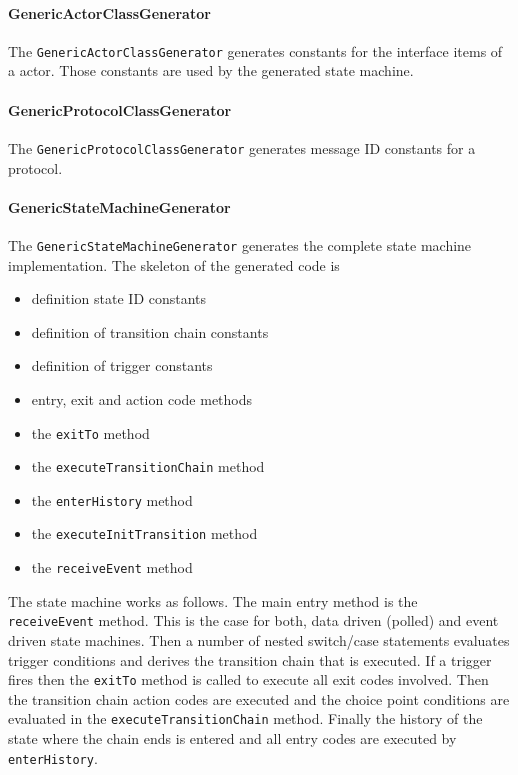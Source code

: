 \paragraph{GenericActorClassGenerator}

The \texttt{GenericActorClassGenerator} generates constants for the interface items of a actor. Those 
constants are used by the generated state machine.

\paragraph{GenericProtocolClassGenerator}

The \texttt{GenericProtocolClassGenerator} generates message ID constants for a protocol.

\paragraph{GenericStateMachineGenerator}

\begin{flushleft}The \texttt{GenericStateMachineGenerator} generates the complete state machine 
implementation. The skeleton of the generated code is\end{flushleft}

\begin{itemize}
\item definition state ID constants
\item definition of transition chain constants
\item definition of trigger constants
\item entry, exit and action code methods
\item the \texttt{exitTo} method 
\item the \texttt{executeTransitionChain} method
\item the \texttt{enterHistory} method
\item the \texttt{executeInitTransition} method
\item the \texttt{receiveEvent} method
\end{itemize}

The state machine works as follows. The main entry method is the \\ \texttt{receiveEvent} method. This is 
the case for both, data driven (polled) and event driven state machines. Then a number of nested 
switch/case statements evaluates trigger conditions and derives the transition chain that is executed. If 
a trigger fires then the \texttt{exitTo} method is called to execute all exit codes involved. Then the 
transition chain action codes are executed and the choice point conditions are evaluated in the 
\texttt{executeTransitionChain} method. Finally the history of the state where the chain ends is entered 
and all entry codes are executed by \texttt{enterHistory}.

